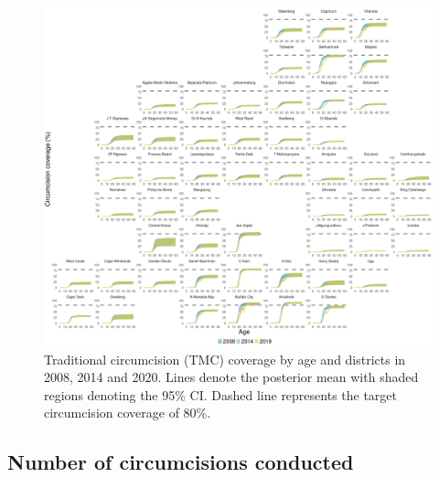 \documentclass{article}
\begin{document}
\begin{appendix}
\begin{figure}[H]
	\centering
	\includegraphics[width = \linewidth]{Figures/suppmat/Coverage/TMCcoverage_SingleAge_District.pdf}
	\caption{Traditional circumcision (TMC) coverage by age and districts in 2008, 2014 and 2020. Lines denote the posterior mean with shaded regions denoting the 95\% CI. Dashed line represents the target circumcision coverage of 80\%.}
\end{figure}	



\subsection{Number of circumcisions conducted}



\end{appendix}
\end{document}
